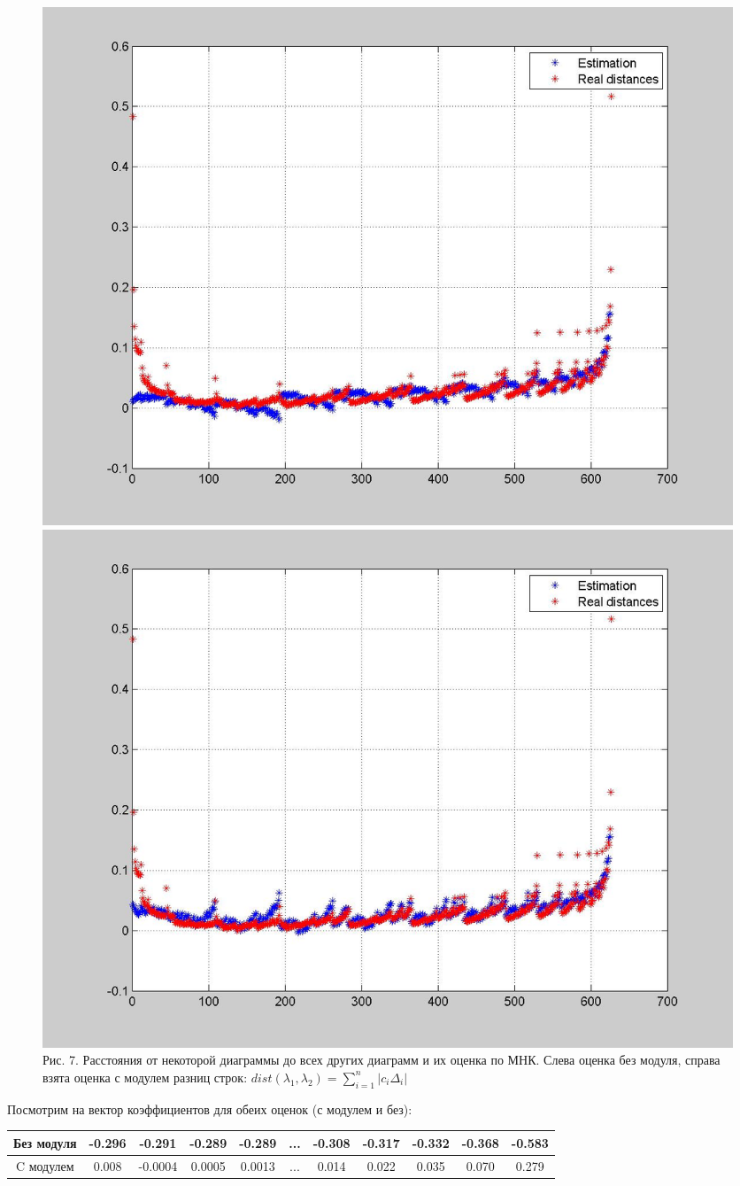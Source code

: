 \documentclass[12pt]{report}
\begin{document}
\begin{figure}[!ht]
\begin{center}
\includegraphics[scale=0.2]{MetricEstimation20}
\includegraphics[scale=0.2]{MetricEstimation20Fabs}
\\Рис. 7. Расстояния от некоторой диаграммы до всех других диаграмм и их оценка по МНК. Слева оценка без модуля, справа взята оценка с модулем разниц строк: $dist(\lambda_1, \lambda_2) = \sum\limits_{i = 1}^n |c_i\Delta_i|$
\end{center}
\end{figure}

Посмотрим на вектор коэффициентов для обеих оценок (с модулем и без):
\begin{center}
\begin{tabular}{|c|c|c|c|c|c|c|c|c|c|c|}
\hline
Без модуля &-0.296 & -0.291 & -0.289 &-0.289 &... & -0.308& -0.317& -0.332 &-0.368 &-0.583\\
\hline
C модулем & 0.008 & -0.0004 & 0.0005 & 0.0013&...& 0.014 & 0.022& 0.035& 0.070 & 0.279  \\
\hline
\end{tabular}
\end{center}
\end{document}
